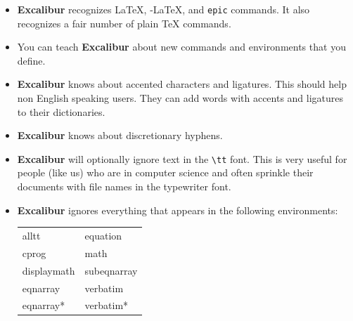 ﻿\documentclass[11pt,titlepage]{article}
\newcommand{\ex}{\textbf{Excalibur}}
\newcommand{\AmS}{\latex{{\protect\the\textfont2
        A\kern-.1667em\lower.5ex\hbox{M}\kern-.125emS}}\html{AMS}}
\begin{document}
\begin{itemize}

\item \ex{} recognizes \LaTeX, \AmS-\LaTeX, and \texttt{epic}
  commands. It also recognizes a fair number of plain \TeX{} commands.

\item You can teach \ex{} about new commands and environments that you
  define.

\item \ex{} knows about accented characters and ligatures. This should
  help non English speaking users. They can add words with accents and
  ligatures to their dictionaries.

\item \ex{} knows about discretionary hyphens.

\item \ex{} will optionally ignore text in the \verb+\tt+ font. This
  is very useful for people (like us) who are in computer science and
  often sprinkle their documents with file names in the typewriter
  font.

\item \ex{} ignores everything that appears in the following
  environments:


  \begin{latexonly}
    \begin{tt}
      \begin{tabular}{ll}
        alltt       & equation    \\
        cprog       & math        \\
        displaymath & subeqnarray \\
        eqnarray    & verbatim    \\
        eqnarray*   & verbatim*
      \end{tabular}
    \end{tt}
  \end{latexonly}


\end{itemize}
\end{document}
